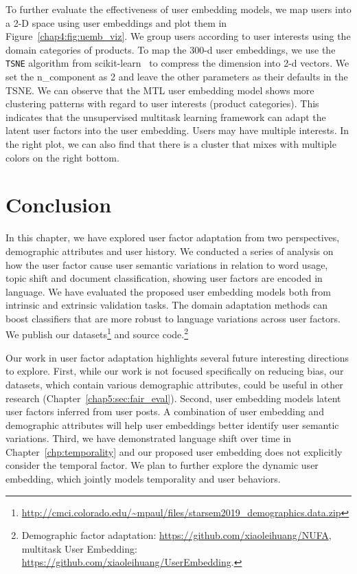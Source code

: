 To further evaluate the effectiveness of user embedding models, we map users into a 2-D space using user embeddings and plot them in Figure~\ref{chap4:fig:uemb_viz}.
We group users according to user interests using the domain categories of products.
To map the 300-d user embeddings, we use the \texttt{TSNE} algorithm from scikit-learn~\cite{pedregosa2011scikit} to compress the dimension into 2-d vectors. We set the n\_component as 2 and leave the other parameters as their defaults in the TSNE.
We can observe that the MTL user embedding model shows more clustering patterns with regard to user interests (product categories).
This indicates that the unsupervised multitask learning framework can adapt the latent user factors into the user embedding.
Users may have multiple interests. In the right plot, we can also find that there is a cluster that mixes with multiple colors on the right bottom.


\section{Conclusion}

In this chapter, we have explored user factor adaptation from two perspectives, demographic attributes and user history.
We conducted a series of analysis on how the user factor cause user semantic variations in relation to word usage, topic shift and document classification, showing user factors are encoded in language.
We have evaluated the proposed user embedding models both from intrinsic and extrinsic validation tasks. 
The domain adaptation methods can boost classifiers that are more robust to language variations across user factors.
We publish our datasets\footnote{\url{http://cmci.colorado.edu/~mpaul/files/starsem2019_demographics.data.zip}} and source code.\footnote{Demographic factor adaptation: \url{https://github.com/xiaoleihuang/NUFA}, multitask User Embedding: \url{https://github.com/xiaoleihuang/UserEmbedding}.}

Our work in user factor adaptation highlights several future interesting directions to explore.
First, while our work is not focused specifically on reducing bias,
our datasets, which contain various demographic attributes, could be useful in other research (Chapter~\ref{chap5:sec:fair_eval}). 
Second, user embedding models latent user factors inferred from user posts. A combination of user embedding and demographic attributes will help user embeddings better identify user semantic variations. 
Third, we have demonstrated language shift over time in Chapter~\ref{chp:temporality} and our proposed user embedding does not explicitly consider the temporal factor. We plan to further explore the dynamic user embedding, which jointly models temporality and user behaviors.
